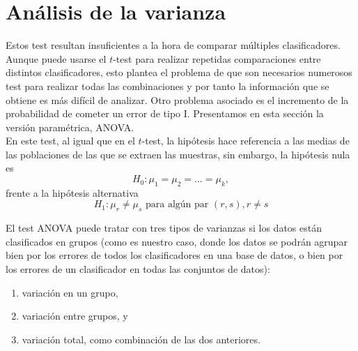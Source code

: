 		
\section{Análisis de la varianza}

	Estos test resultan insuficientes a la hora de comparar 
múltiples clasificadores. Aunque puede usarse el $t$-test para 
realizar repetidas comparaciones entre distintos 
clasificadores, esto plantea el problema de que son 
necesarios numerosos test para realizar todas las 
combinaciones y por tanto la información que se obtiene es
más difícil de analizar. Otro problema asociado es el 
incremento de la probabilidad de cometer un error de tipo I. 
Presentamos en esta sección la versión paramétrica, ANOVA.\\
	En este test, al igual que en el $t$-test, la hipótesis 
hace referencia a las medias de las poblaciones de las que 
se extraen las muestras, sin embargo, la hipótesis nula es
	\[
		H_0 : \mu_1 = \mu_2 = \dots = \mu_k,
	\]
	frente a la hipótesis alternativa
	\[
		H_1 : \mu_r \neq \mu_s \text{ para algún par }
			(r, s), r \neq s 
	\]
	
	El test ANOVA puede tratar con tres tipos de varianzas
si los datos están clasificados en grupos (como es nuestro
caso, donde los datos se podrán agrupar bien por los errores
de todos los clasificadores en una base de datos, o bien por
los errores de un clasificador en todas las conjuntos de datos):
	\begin{enumerate}
	\item variación en un grupo,
	\item variación entre grupos, y
	\item variación total, como combinación de las 
		dos anteriores.
	\end{enumerate}

